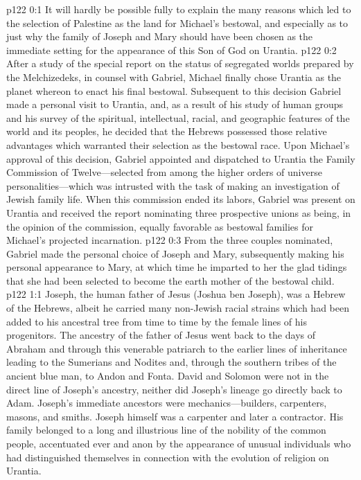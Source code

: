\author{Midwayer Commission}
\vs p122 0:1 It will hardly be possible fully to explain the many reasons which led to the selection of Palestine as the land for Michael’s bestowal, and especially as to just why the family of Joseph and Mary should have been chosen as the immediate setting for the appearance of this Son of God on Urantia.
\vs p122 0:2 After a study of the special report on the status of segregated worlds prepared by the Melchizedeks, in counsel with Gabriel, Michael finally chose Urantia as the planet whereon to enact his final bestowal. Subsequent to this decision Gabriel made a personal visit to Urantia, and, as a result of his study of human groups and his survey of the spiritual, intellectual, racial, and geographic features of the world and its peoples, he decided that the Hebrews possessed those relative advantages which warranted their selection as the bestowal race. Upon Michael’s approval of this decision, Gabriel appointed and dispatched to Urantia the Family Commission of Twelve---selected from among the higher orders of universe personalities---which was intrusted with the task of making an investigation of Jewish family life. When this commission ended its labors, Gabriel was present on Urantia and received the report nominating three prospective unions as being, in the opinion of the commission, equally favorable as bestowal families for Michael’s projected incarnation.\plusone
\vs p122 0:3 From the three couples nominated, Gabriel made the personal choice of Joseph and Mary, subsequently making his personal appearance to Mary, at which time he imparted to her the glad tidings that she had been selected to become the earth mother of the bestowal child.
\vs p122 1:1 Joseph, the human father of Jesus (Joshua ben Joseph), was a Hebrew of the Hebrews, albeit he carried many non\hyp{}Jewish racial strains which had been added to his ancestral tree from time to time by the female lines of his progenitors. The ancestry of the father of Jesus went back to the days of Abraham and through this venerable patriarch to the earlier lines of inheritance leading to the Sumerians and Nodites and, through the southern tribes of the ancient blue man, to Andon and Fonta. David and Solomon were not in the direct line of Joseph’s ancestry, neither did Joseph’s lineage go directly back to Adam. Joseph’s immediate ancestors were mechanics---builders, carpenters, masons, and smiths. Joseph himself was a carpenter and later a contractor. His family belonged to a long and illustrious line of the nobility of the common people, accentuated ever and anon by the appearance of unusual individuals who had distinguished themselves in connection with the evolution of religion on Urantia.
